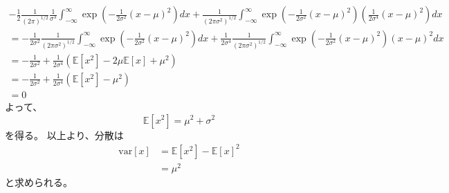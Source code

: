 \documentclass[a4j,dvipdfmx]{jsarticle}
\newcommand{\E}{\mathbb{E}}
\newcommand{\var}{\mathrm{var}}
\begin{document}
\begin{align*}
    -\frac{1}{2}\frac{1}{(2\pi)^{1/2}} \frac{1}{\sigma^3} 
    \int_{-\infty}^{\infty}\exp \left( -\frac{1}{2\sigma^2}(x-\mu)^2 \right) dx
    + \frac{1}{(2\pi \sigma^2)^{1/2}} \int_{-\infty}^{\infty}\exp \left( -\frac{1}{2\sigma^2}(x-\mu)^2 \right)
    \left(\frac{1}{2\sigma^4}(x-\mu)^2 \right) dx \\
    = -\frac{1}{2\sigma^2}\frac{1}{(2\pi \sigma^2)^{1/2}}
    \int_{-\infty}^{\infty}\exp \left( -\frac{1}{2\sigma^2}(x-\mu)^2 \right) dx
    + \frac{1}{2\sigma^4} \frac{1}{(2\pi \sigma^2)^{1/2}} \int_{-\infty}^{\infty}\exp \left( -\frac{1}{2\sigma^2}(x-\mu)^2 \right)
    (x-\mu)^2 dx \\
    = -\frac{1}{2\sigma^2} + \frac{1}{2\sigma^4}(\E[x^2] - 2\mu\E[x] + \mu^2) \\
    = -\frac{1}{2\sigma^2} + \frac{1}{2\sigma^4}(\E[x^2] - \mu^2) \\
    = 0
\end{align*}
よって、
\begin{equation*}
    \E[x^2] = \mu^2 + \sigma^2
\end{equation*}
を得る。
以上より、分散は
\begin{align*}
    \var[x] &= \E[x^2] - \E[x]^2 \\
    &= \mu^2
\end{align*}
と求められる。
\end{document}
